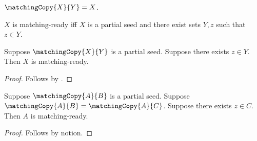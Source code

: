 \begin{definition}\label{matching_premise_copy}
    $\matchingCopy{X}{Y}=X$.
\end{definition}

\begin{definition}\label{matching_premise_target}
    $X$ is matching-ready iff $X$ is a partial seed and
        there exist sets $Y,z$ such that $z\in Y$.
\end{definition}

\begin{classification}\label{matching_premise_rule}
    Suppose $\matchingCopy{X}{Y}$ is a partial seed.
    Suppose there exists $z\in Y$.
    Then $X$ is matching-ready.
\end{classification}
\begin{proof}
    Follows by .
\end{proof}

\begin{proposition}\label{matching_premise_consumer}
    Suppose $\matchingCopy{A}{B}$ is a partial seed.
    Suppose $\matchingCopy{A}{B}=\matchingCopy{A}{C}$.
    Suppose there exists $z\in C$.
    Then $A$ is matching-ready.
\end{proposition}
\begin{proof}
    Follows by notion.
\end{proof}
